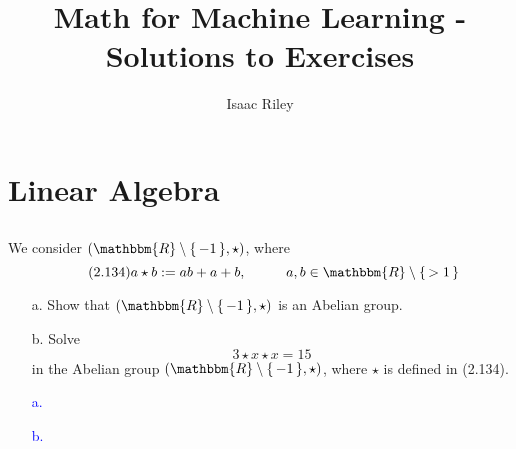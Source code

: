 \documentclass[a4paper,12pt]{article}
\title{Math for Machine Learning - Solutions to Exercises}
\author{Isaac Riley}
\newcommand{\Br}[1]{\{\, #1 \,\}}
\newcommand{\R}{\mathbbm{R}}
\begin{document}
\maketitle
\tableofcontents
\newpage



\setcounter{section}{1}
\newpage%
\section{Linear Algebra}
\subsection{}
We consider $(\R \setminus \Br{-1}, \star)$, where
\begin{equation} \tag{2.134}
a \star b := ab+a+b, \hspace{1cm} a,b \in \R \setminus \Br{>1}
\end{equation}
\begin{itemize}
 \item [a.] Show that $(\R \setminus \Br{-1}, \star)$ is an Abelian group.
 \item [b.] Solve
\begin{equation*}
3 \star x \star x = 15
\end{equation*}
in the Abelian group $(\R \setminus \Br{-1}, \star)$, where $\star$ is defined in (2.134).
\end{itemize}
\textcolor{blue}{
\begin{itemize}
 \item [a.]
 \item [b.]
\end{itemize}
}
\end{document}
